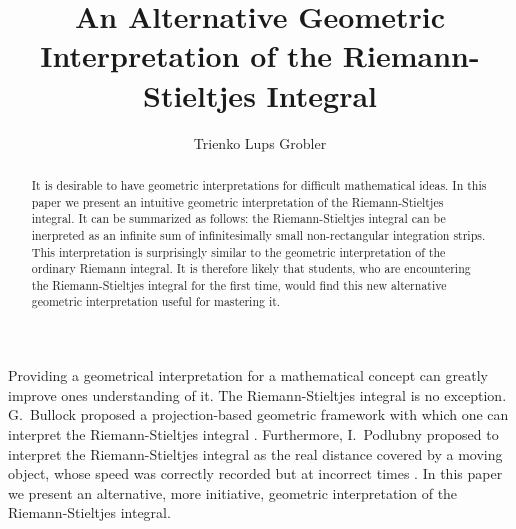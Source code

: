 \documentclass{article}
\theoremstyle{theorem}
\theoremstyle{definition}
\begin{document}
\title{An Alternative Geometric Interpretation of the Riemann-Stieltjes Integral}
\author{Trienko Lups Grobler}

\maketitle

\begin{abstract}
It is desirable to have geometric interpretations for difficult mathematical ideas. In this paper we present an intuitive geometric interpretation of the Riemann-Stieltjes integral. It can be 
summarized as follows: the Riemann-Stieltjes integral can be inerpreted as an infinite sum of infinitesimally small non-rectangular 
integration strips. This interpretation is surprisingly similar to the geometric interpretation of the ordinary Riemann integral. 
It is therefore likely that students, who are encountering the Riemann-Stieltjes integral for the first time, would find this new alternative geometric interpretation useful for mastering it.
\end{abstract}

\noindent
Providing a geometrical interpretation for a mathematical concept can greatly improve ones understanding of it. The Riemann-Stieltjes 
integral is no exception. G.~Bullock proposed a projection-based geometric framework with which one can interpret the Riemann-Stieltjes 
integral \cite{bullock1988}. Furthermore, I.~Podlubny proposed to interpret the Riemann-Stieltjes integral as the real distance covered by a moving object, whose speed was 
correctly recorded but at incorrect times \cite{podlubny2002}. In this paper we present an alternative, more initiative, geometric interpretation of the Riemann-Stieltjes integral.\\
\end{document}
